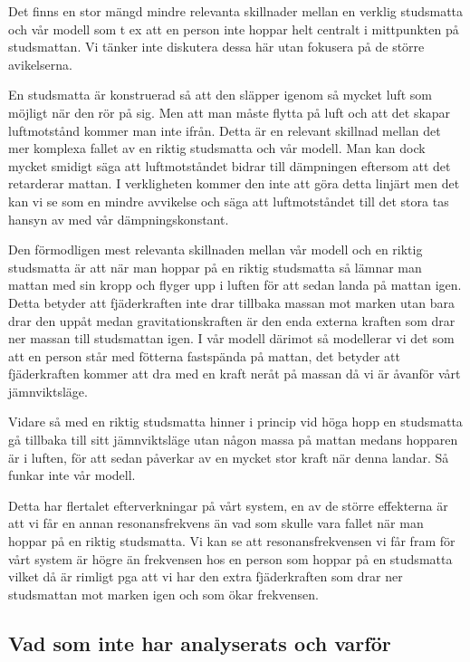 \documentclass[10pt,a4paper]{article}
\begin{document}
Det finns en stor mängd mindre relevanta skillnader mellan en verklig studsmatta och vår modell som t ex att en person inte hoppar helt centralt i mittpunkten på studsmattan. Vi tänker inte diskutera dessa här utan fokusera på de större avikelserna.

En studsmatta är konstruerad så att den släpper igenom så mycket luft som möjligt när den rör på sig. Men att man måste flytta på luft och att det skapar luftmotstånd kommer man inte ifrån. Detta är en relevant skillnad mellan det mer komplexa fallet av en riktig studsmatta och vår modell. Man kan dock mycket smidigt säga att luftmotståndet bidrar till dämpningen eftersom att det retarderar mattan. I verkligheten kommer den inte att göra detta linjärt men det kan vi se som en mindre avvikelse och säga att luftmotståndet till det stora tas hansyn av med vår dämpningskonstant.

Den förmodligen mest relevanta skillnaden mellan vår modell och en riktig studsmatta är att när man hoppar på en riktig studsmatta så lämnar man mattan med sin kropp och flyger upp i luften för att sedan landa på mattan igen. Detta betyder att fjäderkraften inte drar tillbaka massan mot marken utan bara drar den uppåt medan gravitationskraften är den enda externa kraften som drar ner massan till studsmattan igen. I vår modell därimot så modellerar vi det som att en person står med fötterna fastspända på mattan, det betyder att fjäderkraften kommer att dra med en kraft neråt på massan då vi är åvanför vårt jämnviktsläge.

Vidare så med en riktig studsmatta hinner i princip vid höga hopp en studsmatta gå tillbaka till sitt jämnviktsläge utan någon massa på mattan medans hopparen är i luften, för att sedan påverkar av en mycket stor kraft när denna landar. Så funkar inte vår modell.

Detta har flertalet efterverkningar på vårt system, en av de större effekterna är att vi får en annan resonansfrekvens än vad som skulle vara fallet när man hoppar på en riktig studsmatta. Vi kan se att resonansfrekvensen vi får fram för vårt system är högre än frekvensen hos en person som hoppar på en studsmatta vilket då är rimligt pga att vi har den extra fjäderkraften som drar ner studsmattan mot marken igen och som ökar frekvensen.

\subsection{Vad som inte har analyserats och varför}
\end{document}
